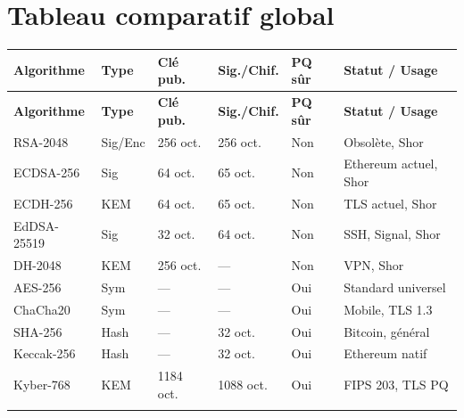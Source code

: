 \documentclass[12pt, a4paper]{article}
\begin{document}
\section{Tableau comparatif global}

\begin{center}
\small\renewcommand{\arraystretch}{1.5}
\begin{longtable}{p{2.8cm}p{1.5cm}p{1.8cm}p{1.8cm}p{1.5cm}p{3.5cm}}
  \toprule
  \textbf{Algorithme} & \textbf{Type} & \textbf{Clé pub.} & \textbf{Sig./Chif.} & \textbf{PQ sûr} & \textbf{Statut / Usage} \\
  \midrule
  \endfirsthead
  \toprule
  \textbf{Algorithme} & \textbf{Type} & \textbf{Clé pub.} & \textbf{Sig./Chif.} & \textbf{PQ sûr} & \textbf{Statut / Usage} \\
  \midrule
  \endhead
  \rowcolor{danger_red!8}
  RSA-2048 & Sig/Enc & 256 oct. & 256 oct. & \textcolor{danger_red}{Non} & Obsolète, Shor \\
  \rowcolor{danger_red!8}
  ECDSA-256 & Sig & 64 oct. & 65 oct. & \textcolor{danger_red}{Non} & Ethereum actuel, Shor \\
  \rowcolor{danger_red!8}
  ECDH-256 & KEM & 64 oct. & 65 oct. & \textcolor{danger_red}{Non} & TLS actuel, Shor \\
  \rowcolor{danger_red!8}
  EdDSA-25519 & Sig & 32 oct. & 64 oct. & \textcolor{danger_red}{Non} & SSH, Signal, Shor \\
  \rowcolor{danger_red!8}
  DH-2048 & KEM & 256 oct. & --- & \textcolor{danger_red}{Non} & VPN, Shor \\
  \midrule
  \rowcolor{success_bg}
  AES-256 & Sym & --- & --- & \textcolor{sol_green}{Oui} & Standard universel \\
  \rowcolor{success_bg}
  ChaCha20 & Sym & --- & --- & \textcolor{sol_green}{Oui} & Mobile, TLS 1.3 \\
  \rowcolor{success_bg}
  SHA-256 & Hash & --- & 32 oct. & \textcolor{sol_green}{Oui} & Bitcoin, général \\
  \rowcolor{success_bg}
  Keccak-256 & Hash & --- & 32 oct. & \textcolor{sol_green}{Oui} & Ethereum natif \\
  \midrule
  \rowcolor{purple_pq!8}
  Kyber-768 & KEM & 1184 oct. & 1088 oct. & \textcolor{sol_green}{Oui} & FIPS 203, TLS PQ \\
  \rowcolor{purple_pq!8}

\end{longtable}
\end{center}
\end{document}
